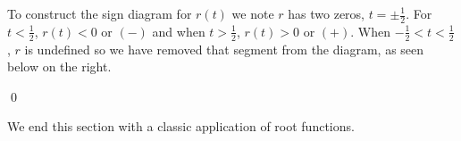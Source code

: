 \documentclass{ximera}
\begin{document}
\begin{example}
\begin{enumerate}
\smallskip

To construct the sign diagram for $r(t)$ we note $r$ has two zeros, $t = \pm \frac{1}{2}$.  For $t < \frac{1}{2}$, $r(t) < 0$ or $(-)$ and when $t > \frac{1}{2}$, $r(t) > 0$ or $(+)$.  When $-\frac{1}{2} < t < \frac{1}{2}$, $r$ is undefined so we have removed that segment from the diagram, as seen below on the right.

\begin{center}


\end{center} 
\begin{center}
\end{center}

\qed
\end{enumerate}

\end{example}

We end this section with a classic application of root functions.
\end{document}
